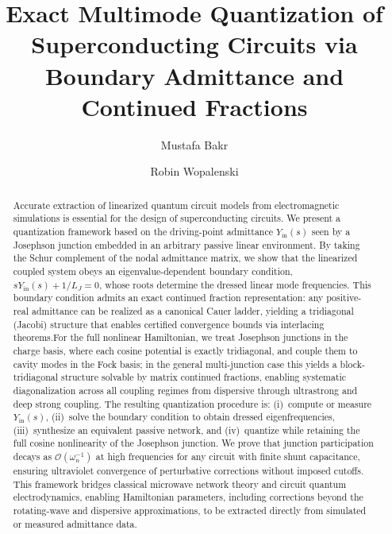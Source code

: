 \documentclass[reprint, floatfix, superscriptaddress, amsmath, amssymb, longbibliography]{revtex4-2}
\begin{document}
\raggedbottom

\title{Exact Multimode Quantization of Superconducting Circuits via Boundary Admittance and Continued Fractions}

\author{Mustafa Bakr}
\author{Robin Wopalenski}


\begin{abstract}
Accurate extraction of linearized quantum circuit models from electromagnetic simulations is essential for the design of superconducting circuits. We present a quantization framework based on the driving-point admittance $Y_{\mathrm{in}}(s)$ seen by a Josephson junction embedded in an arbitrary passive linear environment. By taking the Schur complement of the nodal admittance matrix, we show that the linearized coupled system obeys an eigenvalue-dependent boundary condition, $s Y_{\mathrm{in}}(s) + 1/L_J = 0$, whose roots determine the dressed linear mode frequencies. This boundary condition admits an exact continued fraction representation: any positive-real admittance can be realized as a canonical Cauer ladder, yielding a tridiagonal (Jacobi) structure that enables certified convergence bounds via interlacing theorems.For the full nonlinear Hamiltonian, we treat Josephson junctions in the charge basis, where each cosine potential is exactly tridiagonal, and couple them to cavity modes in the Fock basis; in the general multi-junction case this yields a block-tridiagonal structure solvable by matrix continued fractions, enabling systematic diagonalization across all coupling regimes from dispersive through ultrastrong and deep strong coupling. The resulting quantization procedure is: (i)~compute or measure $Y_{\mathrm{in}}(s)$, (ii)~solve the boundary condition to obtain dressed eigenfrequencies, (iii)~synthesize an equivalent passive network, and (iv)~quantize while retaining the full cosine nonlinearity of the Josephson junction. We prove that junction participation decays as $\mathcal{O}(\omega_n^{-1})$ at high frequencies for any circuit with finite shunt capacitance, ensuring ultraviolet convergence of perturbative corrections without imposed cutoffs. This framework bridges classical microwave network theory and circuit quantum electrodynamics, enabling Hamiltonian parameters, including corrections beyond the rotating-wave and dispersive approximations, to be extracted directly from simulated or measured admittance data.

\end{abstract}
\end{document}
